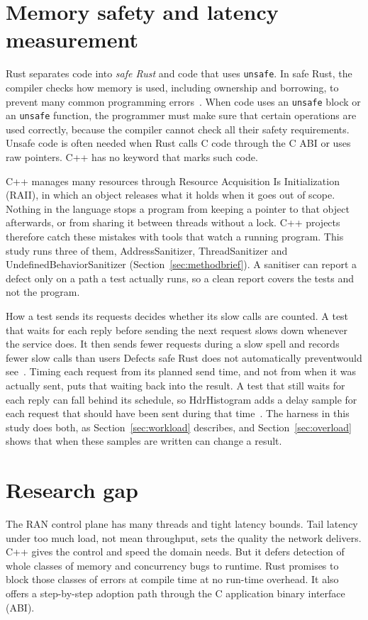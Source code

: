 \documentclass[english,oneside,a4paper,censored,csm,software-track-2020]{HYthesisML}
\begin{document}
\section{Memory safety and latency measurement}\label{sec:rustsafety}
Rust separates code into \emph{safe Rust} and code that uses \texttt{unsafe}. In safe
Rust, the compiler checks how memory is used, including ownership and borrowing, to
prevent many common programming errors~\cite{klabnik2023rust,jung2018rustbelt}. When code
uses an \texttt{unsafe} block or an \texttt{unsafe} function, the programmer must make sure
that certain operations are used correctly, because the compiler cannot check all their
safety requirements. Unsafe code is often needed when Rust calls C code through the C ABI
or uses raw pointers. C++ has no keyword that marks such code.

C++ manages many resources through Resource Acquisition Is Initialization (RAII), in
which an object releases what it holds when it goes out of scope. Nothing in the language
stops a program from keeping a pointer to that object afterwards, or from sharing it
between threads without a lock. C++ projects therefore catch these mistakes
with tools that watch a running program. This study runs three of them, AddressSanitizer,
ThreadSanitizer and UndefinedBehaviorSanitizer (Section~\ref{sec:methodbrief}). A sanitiser can report a
defect only on a path a test actually runs, so a clean report covers the tests and not the
program.

How a test sends its requests decides whether its slow calls are counted. A test that
waits for each reply before sending the next request slows down whenever the service does.
It then sends fewer requests during a slow spell and records fewer slow calls than users
Defects safe Rust does not automatically preventwould see~\cite{schroeder2006openclosed}. Timing each request from its planned send time,
and not from when it was actually sent, puts that waiting back into the result. A test that
still waits for each reply can fall behind its schedule, so HdrHistogram adds a delay sample
for each request that should have been sent during that time~\cite{tene_hdrhistogram}. The
harness in this study does both, as Section~\ref{sec:workload} describes, and
Section~\ref{sec:overload} shows that when these samples are written can change a result.

\section{Research gap}\label{sec:gap}
The RAN control plane has many threads and
tight latency bounds. Tail latency under too much load, not mean throughput, sets
the quality the network delivers. C++ gives the control and speed the domain
needs. But it defers detection of whole classes of memory and concurrency bugs
to runtime. Rust promises to block those classes of errors at compile time at no
run-time overhead. It also offers a step-by-step adoption path through the C
application binary interface (ABI).
\end{document}

